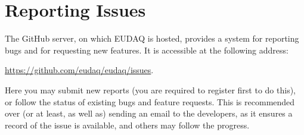 \section{Reporting Issues}
\label{sec:reporting}
The GitHub server, on which EUDAQ is hosted, provides a system for reporting bugs and for requesting new features.
It is accessible at the following address: 

\url{https://github.com/eudaq/eudaq/issues}.

Here you may submit new reports (you are required to register first to do this),
or follow the status of existing bugs and feature requests.
This is recommended over (or at least, as well as) sending an email to the developers,
as it ensures a record of the issue is available, and others may follow the progress.
